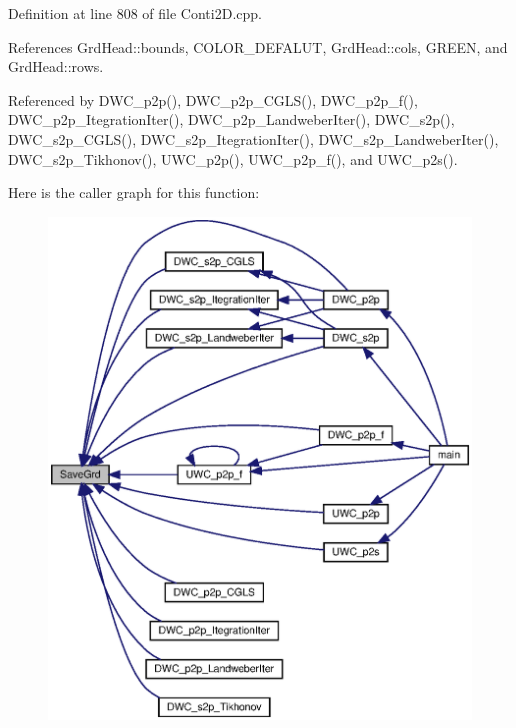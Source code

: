 Definition at line 808 of file Conti2\+D.\+cpp.



References Grd\+Head\+::bounds, C\+O\+L\+O\+R\+\_\+\+D\+E\+F\+A\+L\+UT, Grd\+Head\+::cols, G\+R\+E\+EN, and Grd\+Head\+::rows.



Referenced by D\+W\+C\+\_\+p2p(), D\+W\+C\+\_\+p2p\+\_\+\+C\+G\+L\+S(), D\+W\+C\+\_\+p2p\+\_\+f(), D\+W\+C\+\_\+p2p\+\_\+\+Itegration\+Iter(), D\+W\+C\+\_\+p2p\+\_\+\+Landweber\+Iter(), D\+W\+C\+\_\+s2p(), D\+W\+C\+\_\+s2p\+\_\+\+C\+G\+L\+S(), D\+W\+C\+\_\+s2p\+\_\+\+Itegration\+Iter(), D\+W\+C\+\_\+s2p\+\_\+\+Landweber\+Iter(), D\+W\+C\+\_\+s2p\+\_\+\+Tikhonov(), U\+W\+C\+\_\+p2p(), U\+W\+C\+\_\+p2p\+\_\+f(), and U\+W\+C\+\_\+p2s().

Here is the caller graph for this function\+:\nopagebreak
\begin{figure}[H]
\begin{center}
\leavevmode
\includegraphics[width=350pt]{Conti2D_8cpp_ab76adf263893ac28772283c5a00b964c_ab76adf263893ac28772283c5a00b964c_icgraph}
\end{center}
\end{figure}
\mbox{\label{Conti2D_8cpp_ab2ce25b899be8dca564dd7dccde5e671_ab2ce25b899be8dca564dd7dccde5e671}} 
